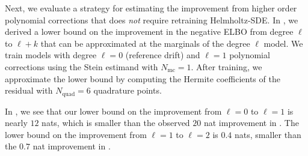 \begin{table}[h]
\caption{Ablation of the $q$-divergence-free correction used by Helmholtz-SDE. 
Dashes represent configurations that could not fit in memory on an 80 GB GPU.
Errors are $\pm2$ SE over $10$ replicates.
}
\label{tab:lorenz-nelbo}
\end{table}

Next, we evaluate a strategy for estimating the improvement from higher order polynomial corrections that does \emph{not} require retraining Helmholtz-SDE. 
In , we derived a lower bound on the improvement in the negative ELBO from degree $\ell$ to $\ell + k$ that can be approximated at the marginals of the degree $\ell$ model.
We train models with degree $\ell = 0$ (reference drift) and $\ell = 1$ polynomial corrections using the Stein estimand with $N_{\mathrm{mc}} = 1$.
After training, we approximate the lower bound by computing the Hermite coefficients of the residual with $N_{\mathrm{quad}} = 6$ quadrature points.

In , we see that our lower bound on the improvement from $\ell = 0$ to $\ell = 1$ is nearly $12$ nats, which is smaller than the observed $20$ nat improvement in . 
The lower bound on the improvement from $\ell = 1$ to $\ell = 2$ is $0.4$ nats, smaller than the $0.7$ nat improvement in .

